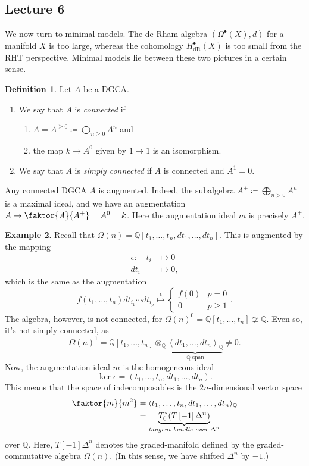 \documentclass[10pt,letterpaper,cm]{nupset}
\theoremstyle{definition}
\newtheorem{defn}{Definition}[subsection]
\newtheorem{exmp}[defn]{Example}
\theoremstyle{theorem}
\theoremstyle{remark}
\newcommand{\Q}{\mathbb Q}
\newcommand{\1}{\mathbb{1}}
\newcommand{\0}{\vec 0}
\DeclareMathOperator{\dr}{dR}
\newcommand{\be}{\begin{enumerate}}
\newcommand{\ee}{\end{enumerate}}
\begin{document}
\subsection{Lecture 6}

We now turn to minimal models. The de Rham algebra $\left(\Omega^{\bullet}(X), d\right)$ for a manifold $X$ is too large, whereas the cohomology $H^{\bullet}_{\dr}(X)$ is too small from the RHT perspective. Minimal models lie between these two pictures in a certain sense.

\begin{defn} Let $A$ be a DGCA.
\be 
\item We say that $A$ is \textit{connected} if 
\be
\item $A = A^{\geq 0} \coloneqq \bigoplus_{n \geq 0} A^n$ and
\item the map $k \to A^0$ given by $1 \mapsto 1$ is an isomorphism. 
\ee
\item We say that $A$ is \textit{simply connected} if $A$ is connected and $A^1 =0$.
\ee
\end{defn}

Any connected DGCA $A$ is augmented. Indeed, the subalgebra $A^+ \coloneqq \bigoplus_{n>0}A^n$ is a maximal ideal, and we have an augmentation $A \to \faktor{A}{A^+} = A^0 =k$. Here the augmentation ideal $m$ is precisely $A^+$.

\begin{exmp}
Recall that $\Omega(n) = \Q\left[t_1, \ldots, t_n, d{t_1}, \ldots, d{t_n}\right]$. This is augmented by the mapping
\begin{align*}
\epsilon : \quad t_i & \mapsto 0
\\ d{t_i} &  \mapsto 0, 
\end{align*}
which is the same as the augmentation
\[
f(t_1, \ldots, t_n)d{t_{i_1}} \cdots d{t_{i_p}} \overset{\epsilon}{\longmapsto} \begin{cases}
f(0) & p =0 
\\ 0 & p \geq 1
\end{cases}
.\] The algebra, however, is not connected, for $\Omega(n)^0 = \Q\left[t_1, \ldots, t_n\right] \not\cong \Q$. Even so, it's not simply connected, as 
\[
\Omega(n)^1 = \Q\left[t_1, \ldots, t_n\right] \otimes_{\Q} \underbrace{\left\langle d{t_1}, \ldots, d{t_n}\right\rangle_{\Q}}_{\text{$\Q$-span}} \ne 0 
.\]
Now, the augmentation ideal $m$ is  the homogeneous ideal
\[
\ker{\epsilon} = \left(t_1, \ldots, t_n, d{t_1}, \ldots, d{t_n}\right).
\] This means that the space of indecomposables is the $2n$-dimensional vector space
\begin{align*}
\faktor{m}{m^2} & = \langle t_1, \ldots, t_n, d{t_1}, \ldots, d{t_n}\rangle_{\Q}
\\ & = \underbrace{T_0^{\ast}(T\left[{-1}\right]{\Delta^n})}_{\textit{tangent bundle over $\Delta^n$}}
\end{align*}
 over $\Q$. Here, $T\left[{-1}\right]{\Delta^n}$ denotes the graded-manifold defined by the graded-commutative algebra $\Omega(n)$. (In this sense, we have shifted $\Delta^n$ by ${-1}$.)
\end{exmp}
\end{document}
